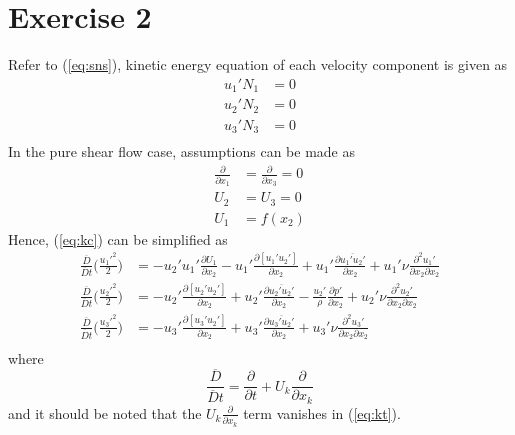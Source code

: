 \documentclass[paper=a4, fontsize=11pt]{scrartcl} %
\numberwithin{equation}{section} %
\numberwithin{figure}{section} %
\numberwithin{table}{section} %
\begin{document}
\section{Exercise 2}
	Refer to (\ref{eq:sns}), kinetic energy equation of each velocity component is given as
	\begin{equation}
		\begin{aligned}
			u_1'N_1 & = 0\\
			u_2'N_2 & = 0\\
			u_3'N_3 & = 0\\
		\end{aligned}
		\label{eq:kc}
	\end{equation}
	In the pure shear flow case, assumptions can be made as
	\begin{equation}
		\begin{aligned}
			\frac{\partial}{\partial x_1} & = \frac{\partial}{\partial x_3} = 0\\
			U_2 & = U_3 = 0\\
			U_1 & = f(x_2)
		\end{aligned}
	\end{equation}
	Hence, (\ref{eq:kc}) can be simplified as
	\begin{equation}
		\begin{aligned}
			\frac{\overline{D}}{\overline{D} t}\Big(\frac{u_1'^2}{2}\Big) & = -u_2' u_1'\frac{\partial U_1}{\partial x_2} - u_1'\frac{\partial [u_1'u_2']}{\partial x_2} + u_1'\frac{\partial \overline{u_1' u_2'}}{\partial x_2} + u_1'\nu \frac{\partial^2 u_1'}{\partial x_2 \partial x_2}\\
			\frac{\overline{D}}{\overline{D} t}\Big(\frac{u_2'^2}{2}\Big) & = -u_2'\frac{\partial [u_2'u_2']}{\partial x_2} + u_2'\frac{\partial \overline{u_2' u_2'}}{\partial x_2} - \frac{u_2'}{\rho}\frac{\partial p'}{\partial x_2}+ u_2'\nu \frac{\partial^2 u_2'}{\partial x_2 \partial x_2}\\
			\frac{\overline{D}}{\overline{D} t}\Big(\frac{u_3'^2}{2}\Big) & = -u_3'\frac{\partial [u_3'u_2']}{\partial x_2} + u_3'\frac{\partial \overline{u_3' u_2'}}{\partial x_2} + u_3'\nu \frac{\partial^2 u_3'}{\partial x_2 \partial x_2}\\
		\end{aligned}
		\label{eq:kt}
	\end{equation}
	where
	\begin{equation}
		\frac{\overline{D}}{\overline{D} t} = \frac{\partial}{\partial t} + U_k \frac{\partial}{\partial x_k}
	\end{equation}
	and it should be noted that the $U_k \frac{\partial}{\partial x_k}$ term vanishes in (\ref{eq:kt}).\\
\end{document}
